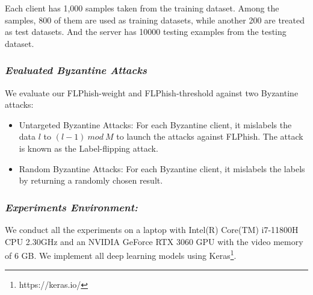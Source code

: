 \documentclass[journal]{IEEEtran}
\begin{document}
  \par Each client has 1,000 samples taken from the training dataset. Among the samples, 800 of them are used as training datasets, while another 200 are treated as test datasets. And the server has 10000 testing examples from the testing dataset. 
  \subsubsection{\textit{Evaluated Byzantine Attacks}} We evaluate our FLPhish-weight and FLPhish-threshold against two Byzantine attacks:
  \begin{itemize}
    \item Untargeted Byzantine Attacks: For each Byzantine client, it mislabels the data $l$ to $(l-1)\ mod\ M$ to launch the attacks against FLPhish. The attack is known as the Label-flipping attack. 
    \item Random Byzantine Attacks: For each Byzantine client, it mislabels the labels by returning a randomly chosen result.
    \end{itemize}

  
  \subsubsection{{\textit{Experiments Environment:}}} We conduct all the experiments on a laptop with Intel(R) Core(TM) i7-11800H CPU 2.30GHz and an NVIDIA GeForce RTX 3060 GPU with the video memory of 6 GB. We implement all deep learning models using Keras\footnote{https://keras.io/}.
\end{document}

